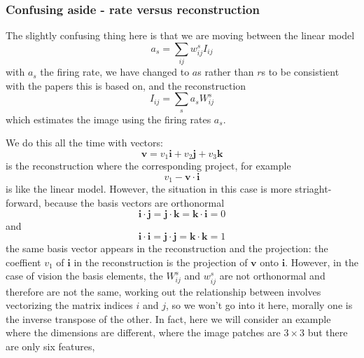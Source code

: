\documentclass[11pt,a4paper]{scrartcl}
\begin{document}
\subsubsection*{Confusing aside - rate versus reconstruction}
The slightly confusing thing here is that we are moving between the linear model 
\begin{equation}
a_s=\sum_{ij} w^s_{ij}I_{ij}
\end{equation}
with $a_s$ the firing rate, we have changed to $a$s rather than $r$s
to be consistient with the papers this is based on, and the
reconstruction
\begin{equation}
I_{ij}=\sum_{s} a_sW^s_{ij}
\end{equation}
which estimates the image using the firing rates $a_s$.

 We do this all the time with vectors:
\begin{equation}
\textbf{v}=v_1\textbf{i}+v_2\textbf{j}+v_3\textbf{k}
\end{equation}
is the reconstruction where the corresponding project, for example
\begin{equation}
v_1-\textbf{v}\cdot\textbf{i}
\end{equation}
is like the linear model. However, the situation in this case is more striaght-forward, because the basis vectors are orthonormal
\begin{equation}
\textbf{i}\cdot\textbf{j}=\textbf{j}\cdot\textbf{k}=\textbf{k}\cdot\textbf{i}=0
\end{equation}
and
\begin{equation}
\textbf{i}\cdot\textbf{i}=\textbf{j}\cdot\textbf{j}=\textbf{k}\cdot\textbf{k}=1
\end{equation}
the same basis vector appears in the reconstruction and the
projection: the coeffient $v_1$ of $\textbf{i}$ in the reconstruction
is the projection of $\textbf{v}$ onto $\textbf{i}$. However, in the
case of vision the basis elements, the $W^s_{ij}$ and $w^s_{ij}$ are
not orthonormal and therefore are not the same, working out the
relationship between involves vectorizing the matrix indices $i$ and
$j$, so we won't go into it here, morally one is the inverse transpose
of the other. In fact, here we will consider an example where the
dimensions are different, where the image patches are $3\times 3$ but
there are only six features, 
\end{document}
